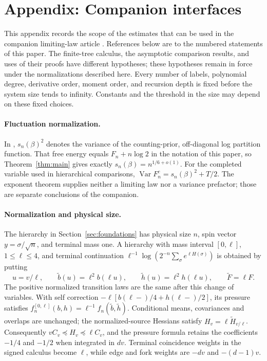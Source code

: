 \section*{Appendix: Companion interfaces}
\hypertarget{scale-law-interface}{}

This appendix records the scope of the estimates that can be used in
the companion limiting-law article \cite{CompanionLaw2026}. References below are to the numbered
statements of this paper. The finite-tree calculus, the asymptotic
comparison results, and uses of their proofs have different hypotheses;
these hypotheses remain in force under the normalizations described here.
Every number of labels, polynomial degree, derivative order, moment order,
and recursion depth is fixed before the system size tends to infinity.
Constants and the threshold in the size may depend on these fixed choices.

\paragraph{Fluctuation normalization.}
In \cite[Section~1]{CompanionLaw2026}, $s_n(\beta)^2$ denotes the
variance of the counting-prior, off-diagonal log partition function.
That free energy equals $F_n+n\log2$ in the notation of this paper,
so Theorem~\ref{thm:main} gives exactly
$s_n(\beta)=n^{1/6+o(1)}$. For the completed variable used in
hierarchical comparisons,
$\operatorname{Var}F_n^c=s_n(\beta)^2+T/2$.
The exponent theorem supplies neither a limiting law nor a variance
prefactor; those are separate conclusions of the companion.

\paragraph{Normalization and physical size.}
The hierarchy in Section~\ref{sec:foundations} has physical size $n$, spin
vector $y=\sigma/\sqrt n$, and terminal mass one. A hierarchy with mass
interval $[0,\ell]$, $1\le\ell\le4$, and terminal continuation
$\ell^{-1}\log(2^{-n}\sum_\sigma e^{\ell H(\sigma)})$ is obtained by
putting
\[
 u=v/\ell,\qquad
 \widetilde b(u)=\ell^2 b(\ell u),\qquad
 \widetilde h(u)=\ell^2 h(\ell u),\qquad
 \widetilde F=\ell F.
\]
The positive normalized transition laws are the same after this change
of variables. With self correction
$-\ell[b(\ell-)/4+h(\ell-)/2]$, its pressure satisfies
$f_n^{[0,\ell]}(b,h)=\ell^{-1}f_n(\widetilde b,\widetilde h)$.
Conditional means, covariances and overlaps are unchanged; the
normalized-source Hessians satisfy $H_v=\ell\widetilde H_{v/\ell}$.
Consequently $vC_v\preceq H_v\preceq\ell C_v$, and the pressure
formula retains the coefficients $-1/4$ and $-1/2$ when integrated in
$dv$. Terminal coincidence weights in the signed calculus become
$\ell$, while edge and fork weights are $-dv$ and $-(d-1)v$.


